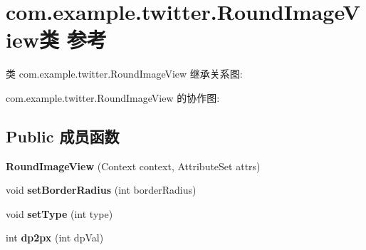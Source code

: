 \hypertarget{classcom_1_1example_1_1twitter_1_1_round_image_view}{}\section{com.\+example.\+twitter.\+Round\+Image\+View类 参考}
\label{classcom_1_1example_1_1twitter_1_1_round_image_view}


类 com.\+example.\+twitter.\+Round\+Image\+View 继承关系图\+:


com.\+example.\+twitter.\+Round\+Image\+View 的协作图\+:
\subsection*{Public 成员函数}
\begin{DoxyCompactItemize}
\item 
\mbox{\label{classcom_1_1example_1_1twitter_1_1_round_image_view_a5ee323a8e6c2291ebaf3a75074cce27e}} 
{\bfseries Round\+Image\+View} (Context context, Attribute\+Set attrs)
\item 
\mbox{\label{classcom_1_1example_1_1twitter_1_1_round_image_view_af370a3354ac15b1d72fcff74c14c3e12}} 
void {\bfseries set\+Border\+Radius} (int border\+Radius)
\item 
\mbox{\label{classcom_1_1example_1_1twitter_1_1_round_image_view_ac6717874e63b270b4b8ef0e89fec4e51}} 
void {\bfseries set\+Type} (int type)
\item 
\mbox{\label{classcom_1_1example_1_1twitter_1_1_round_image_view_a3db1023c3dced8e0092953f4d20cb22b}} 
int {\bfseries dp2px} (int dp\+Val)
\end{DoxyCompactItemize}
